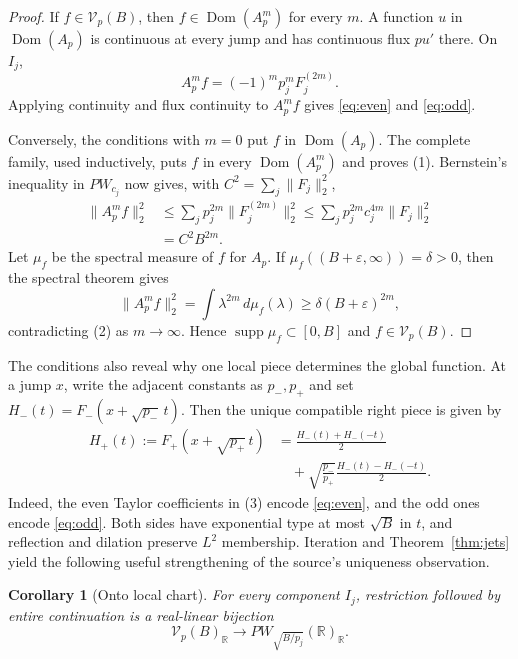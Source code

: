 \documentclass[11pt]{article}
\newtheorem{corollary}{Corollary}
\newcommand{\R}{\mathbb R}
\newcommand{\V}{\mathcal V}
\newcommand{\supp}{\operatorname{supp}}
\newcommand{\Dom}{\operatorname{Dom}}
\begin{document}
\begin{proof}
If $f\in\V_p(B)$, then $f\in\Dom(A_p^m)$ for every $m$.  A function $u$ in
$\Dom(A_p)$ is continuous at every jump and has continuous flux $pu'$ there.
On $I_j$,
\[
                  A_p^m f=(-1)^m p_j^mF_j^{(2m)}.    \tag{1}
\]
Applying continuity and flux continuity to $A_p^m f$ gives
\eqref{eq:even} and \eqref{eq:odd}.

Conversely, the conditions with $m=0$ put $f$ in $\Dom(A_p)$.  The complete
family, used inductively, puts $f$ in every $\Dom(A_p^m)$ and proves (1).
Bernstein's inequality in $PW_{c_j}$ now gives, with
$C^2=\sum_j\|F_j\|_2^2$,
\begin{align*}
 \|A_p^m f\|_2^2
 &\le \sum_j p_j^{2m}\|F_j^{(2m)}\|_2^2
 \le \sum_j p_j^{2m}c_j^{4m}\|F_j\|_2^2\\
 &= C^2B^{2m}.                                      \tag{2}
\end{align*}
Let $\mu_f$ be the spectral measure of $f$ for $A_p$.  If
$\mu_f((B+\varepsilon,\infty))=\delta>0$, then the spectral theorem gives
\[
 \|A_p^m f\|_2^2=\int\lambda^{2m}\,d\mu_f(\lambda)
 \ge\delta(B+\varepsilon)^{2m},
\]
contradicting (2) as $m\to\infty$.  Hence $\supp\mu_f\subset[0,B]$ and
$f\in\V_p(B)$.
\end{proof}

The conditions also reveal why one local piece determines the global
function.  At a jump $x$, write the adjacent constants as $p_-,p_+$ and set
$H_-(t)=F_-(x+\sqrt{p_-}\,t)$.  Then the unique compatible right piece is
given by
\begin{equation}
\begin{aligned}
 H_+(t):=F_+(x+\sqrt{p_+}\,t)
 &=\frac{H_-(t)+H_-(-t)}2 \\
 &\quad+\sqrt{\frac{p_-}{p_+}}
       \frac{H_-(t)-H_-(-t)}2.
\end{aligned}
\tag{3}\label{eq:transfer}
\end{equation}
Indeed, the even Taylor coefficients in (3) encode \eqref{eq:even}, and the
odd ones encode \eqref{eq:odd}.  Both sides have exponential type at most
$\sqrt B$ in $t$, and reflection and dilation preserve $L^2$ membership.
Iteration and Theorem~\ref{thm:jets} yield the following useful strengthening
of the source's uniqueness observation.

\begin{corollary}[Onto local chart]\label{cor:chart}
For every component $I_j$, restriction followed by entire continuation is a
real-linear bijection
\[
            \V_p(B)_{\R}\longrightarrow PW_{\sqrt{B/p_j}}(\R)_{\R}.
\]
\end{corollary}
\end{document}
